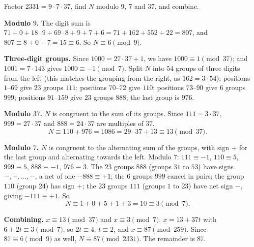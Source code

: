 Factor $2331=9\cdot7\cdot37$, find $N$ modulo $9$, $7$ and $37$, and combine.

\textbf{Modulo $9$.} The digit sum is $71+0+18\cdot9+69\cdot8+9+7+6=71+162+552+22=807$, and $807\equiv8+0+7=15\equiv6$. So $N\equiv6\pmod9$.

\textbf{Three-digit groups.} Since $1000=27\cdot37+1$, we have $1000\equiv1\pmod{37}$; and $1001=7\cdot143$ gives $1000\equiv-1\pmod7$. Split $N$ into $54$ groups of three digits from the left (this matches the grouping from the right, as $162=3\cdot54$): positions $1$--$69$ give $23$ groups $111$; positions $70$--$72$ give $110$; positions $73$--$90$ give $6$ groups $999$; positions $91$--$159$ give $23$ groups $888$; the last group is $976$.

\textbf{Modulo $37$.} $N$ is congruent to the sum of its groups. Since $111=3\cdot37$, $999=27\cdot37$ and $888=24\cdot37$ are multiples of $37$,
\[N\equiv110+976=1086=29\cdot37+13\equiv13\pmod{37}.\]

\textbf{Modulo $7$.} $N$ is congruent to the alternating sum of the groups, with sign $+$ for the last group and alternating towards the left. Modulo $7$: $111\equiv-1$, $110\equiv5$, $999\equiv5$, $888\equiv-1$, $976\equiv3$. The $23$ groups $888$ (groups $31$ to $53$) have signs $-,+,\dots,-$, a net of one $-888\equiv+1$; the $6$ groups $999$ cancel in pairs; the group $110$ (group $24$) has sign $+$; the $23$ groups $111$ (groups $1$ to $23$) have net sign $-$, giving $-111\equiv+1$. So
\[N\equiv1+0+5+1+3=10\equiv3\pmod7.\]

\textbf{Combining.} $x\equiv13\pmod{37}$ and $x\equiv3\pmod7$: $x=13+37t$ with $6+2t\equiv3\pmod7$, so $2t\equiv4$, $t\equiv2$, and $x\equiv87\pmod{259}$. Since $87\equiv6\pmod9$ as well, $N\equiv87\pmod{2331}$. The remainder is $\boxed{87}$.
